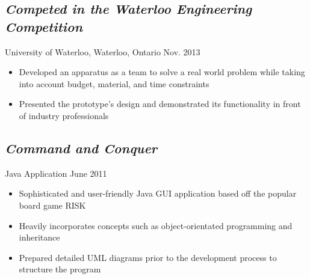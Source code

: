 \documentclass[11pt]{article}
\begin{document}
\begin{minipage}[t]{0.8\linewidth}
	\subsection*{\textit{Competed in the Waterloo Engineering Competition}} \vspace{-6pt} 
		University of Waterloo, Waterloo, Ontario \hspace{115pt} Nov. 2013
		\begin{itemize}
			\item Developed an apparatus as a team to solve a real world problem while taking into account budget, 				material, and time constraints
			\item Presented the prototype's design and demonstrated its functionality in front of industry 								professionals
		\end{itemize}	
	
	\subsection*{\textit{Command and Conquer}} \vspace{-6pt}
		Java Application \hspace{240pt} June 2011
		\begin{itemize}
			\item Sophisticated and user-friendly Java GUI application based off the popular board game RISK
			\item Heavily incorporates concepts such as object-orientated programming and inheritance
			\item Prepared detailed UML diagrams prior to the development process to structure the program
		\end{itemize}
\end{minipage}
\end{document}
